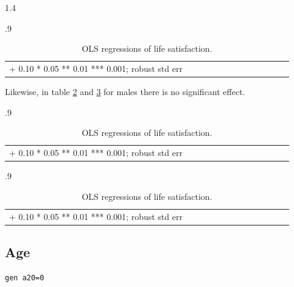 \documentclass[10pt, letterpaper]{article}
\begin{document}
\begin{spacing}{1.4}
\begin{spacing}{.9} \begin{table}[H]\centering   \begin{scriptsize} \begin{tabular}{p{1.8in}p{.5in}p{.5in}p{.5in}p{.5in}p{.5in}p{.5in}p{.5in}p{.5in}p{.5in}p{.5 in}p{.5in}p{.5 in}}\hline  \hline + 0.10 * 0.05 ** 0.01 *** 0.001; robust std err \end{tabular}\end{scriptsize}\caption{\label{regX2}OLS regressions of life satisfaction.}\end{table} \end{spacing}

Likewise, in table \ref{regX3} and \ref{regX4} for males there is no significant effect.

\begin{spacing}{.9} \begin{table}[H]\centering   \begin{scriptsize} \begin{tabular}{p{1.8in}p{.5in}p{.5in}p{.5in}p{.5in}p{.5in}p{.5in}p{.5in}p{.5in}p{.5in}p{.5 in}p{.5in}p{.5 in}}\hline  \hline + 0.10 * 0.05 ** 0.01 *** 0.001; robust std err \end{tabular}\end{scriptsize}\caption{\label{regX3}OLS regressions of life satisfaction.}\end{table} \end{spacing}

\begin{spacing}{.9} \begin{table}[H]\centering   \begin{scriptsize} \begin{tabular}{p{1.8in}p{.5in}p{.5in}p{.5in}p{.5in}p{.5in}p{.5in}p{.5in}p{.5in}p{.5in}p{.5 in}p{.5in}p{.5 in}}\hline  \hline + 0.10 * 0.05 ** 0.01 *** 0.001; robust std err \end{tabular}\end{scriptsize}\caption{\label{regX4}OLS regressions of life satisfaction.}\end{table} \end{spacing}

\subsection{Age}


\begin{verbatim}
gen a20=0


\end{verbatim}
\end{spacing}
\end{document}
